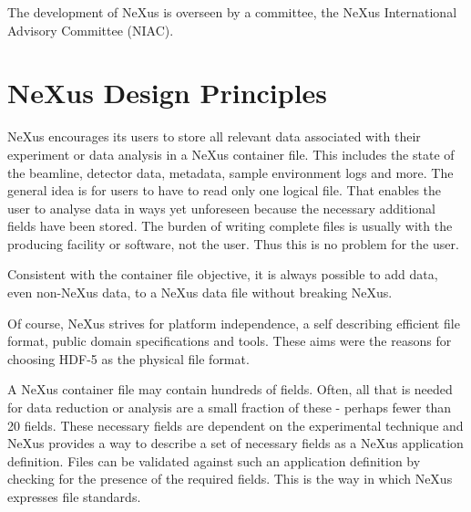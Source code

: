 \documentclass[%
 aip,
rsi,
 amsmath,amssymb,
 reprint,%
]{revtex4-1}
\begin{document}
The development of NeXus is overseen by a committee, the NeXus International Advisory Committee (NIAC).

\section{NeXus Design Principles}


NeXus encourages its users to store all relevant data associated with their experiment or data analysis 
in a NeXus container file. This includes the state of the beamline, detector data, metadata, sample environment 
logs  and more.  The general idea is for users to have to read only one logical file. 
That enables the user to analyse data in ways yet unforeseen because the necessary additional 
fields have been stored. The burden of writing complete files is usually with the producing 
facility or software,  not the user. Thus this is no problem for the user. 

Consistent with the container file objective, it is always possible to add data, even non-NeXus data, 
to a NeXus data file without breaking NeXus. 

Of course, NeXus strives for platform independence, a self describing efficient file format, public 
domain specifications and tools. These aims were the reasons for choosing HDF-5 as the physical file format.

A NeXus container file may contain hundreds of fields. Often, all that is needed for data reduction or analysis are a small fraction 
of these - perhaps fewer than 20 fields. These necessary fields are dependent on the experimental technique and NeXus provides a way to 
describe a set of necessary fields as a NeXus application definition. Files can be validated against such an application definition
by checking for the presence of the required fields. This is the way in which NeXus expresses file standards. 
\end{document}
